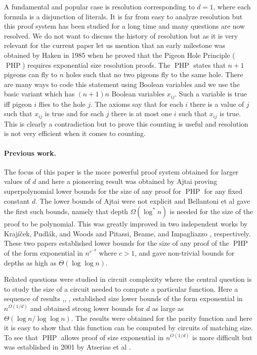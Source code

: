 \documentclass{article}\usepackage[a4paper,margin=20mm]{geometry}
\DeclareMathOperator{\PHP}{PHP}
\begin{document}
A fundamental and popular case is resolution
corresponding to $d=1$, where each formula is a disjunction of literals. 
It is far from easy to analyze resolution
but this proof system has been studied for a long time
and many questions are now resolved.  We do not want to
discuss the history of resolution but as it is very relevant
for the current paper let us mention that an  early milestone
was obtained by Haken \cite{haken} in 1985 when he proved
that the Pigeon Hole Principle ($\PHP$) requires exponential
size resolution proofs.  The $\PHP$ states that $n+1$ pigeons can 
fly to $n$ holes such that no two pigeons fly to the
same hole.  There are many ways to code this statement
using Boolean variables and we use the basic variant
which has $(n+1)n$ Boolean variables $x_{ij}$.  
Such a variable is true 
iff pigeon $i$ flies to the hole $j$.
The axioms say that for each $i$ there is a value
of $j$ such that $x_{ij}$ is true and for 
each $j$ there is at most one $i$ such that $x_{ij}$
is true.  This is clearly a contradiction but to
prove this counting is useful and resolution is not very 
efficient when it comes to counting.

\paragraph{Previous work.} The focus of this paper is the more
powerful proof system obtained for larger values of 
$d$ and here a pioneering result was obtained by 
Ajtai \cite{Ajtai94Complexity} proving superpolynomial lower bounds 
for the size of any proof for $\PHP$ for any fixed constant $d$.
The lower bounds of Ajtai were not explicit and Bellantoni
et al \cite{BPU92ApproximationAS}
gave the first such bounds, namely that depth $\Omega(\log^* n)$ is
needed for the size of the proof to be polynomial.
This was greatly improved 
in two independent works
by Kraj\'{i}\v{c}ek, Pudl\'{a}k, and Woods \cite{KPW95FregePHPExp}
and Pitassi, Beame, and Impagliazzo \cite{PBI93ExponentialLowerBounds},
respectively.  These two papers established lower bounds
for the size of any proof of the $\PHP$
of the form exponential in $n^{c^{-d}}$ where $c>1$, and gave
non-trivial bounds for depths as high as $\Theta (\log {\log n})$.

Related questions were studied in circuit complexity where the
central question is to study the size of a circuit needed
to compute a particular function.  Here a sequence of
results \cite{fss},\cite{sipser}, \cite{yao}, \cite{jhswitch}
established size lower bounds of
the form exponential in $n^{\Omega (1/d)}$ and obtained
strong lower bounds for $d$
as large as $\Theta (\log n / \log {\log n})$.  
The results were obtained for the parity function and
here it is easy to show that this function can be computed
by circuits of matching size.  To see that $\PHP$ 
allows proof of size exponential in $n^{O(1/d)}$ is
more difficult but was established in 2001 by
Atserias et al \cite{agg01}.
\end{document}
